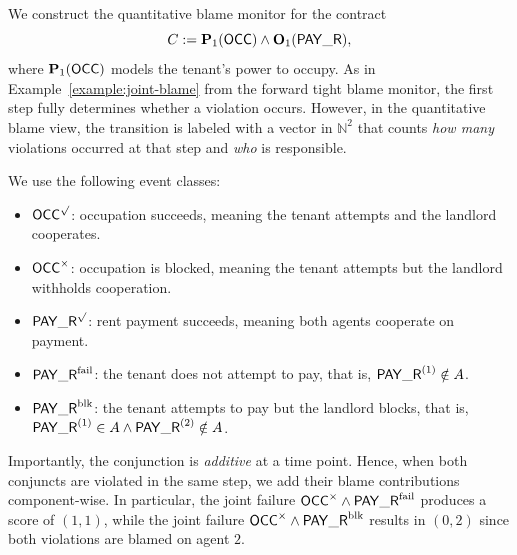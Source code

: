 \begin{example}
\label{ex:qbm-doubleblame}
We construct the quantitative blame monitor for the contract
\[
  C := \perm[1]{\OCC} \wedge \obl[1]{\PAY},
\]
where $\perm[1]{\OCC}$ models the tenant's power to occupy.
As in Example~\ref{example:joint-blame} from the forward tight blame monitor, the first step fully determines whether a violation occurs.
However, in the quantitative blame view, the transition is labeled with a vector in $\mathbb{N}^2$ that counts \emph{how many} violations occurred at that step and \emph{who} is responsible.

We use the following event classes:
\begin{itemize}
  \item $\OCC^\surd$: occupation succeeds, meaning the tenant attempts and the landlord cooperates.
  \item $\OCC^\times$: occupation is blocked, meaning the tenant attempts but the landlord withholds cooperation.
  \item $\PAY^\surd$: rent payment succeeds, meaning both agents cooperate on payment.
  \item $\PAY^{\text{fail}}$: the tenant does not attempt to pay, that is, $\PAY^{(1)}\notin A$.
  \item $\PAY^{\text{blk}}$: the tenant attempts to pay but the landlord blocks, that is, $\PAY^{(1)}\in A\wedge \PAY^{(2)}\notin A$.
\end{itemize}

Importantly, the conjunction is \emph{additive} at a time point.
Hence, when both conjuncts are violated in the same step, we add their blame contributions component-wise.
In particular, the joint failure $\OCC^\times\wedge \PAY^{\text{fail}}$ produces a score of $(1,1)$, while the joint failure $\OCC^\times\wedge \PAY^{\text{blk}}$ results in $(0,2)$ since both violations are blamed on agent $2$.

\begin{figure}[h!]
\centering
{}
\end{figure}
\end{example}
